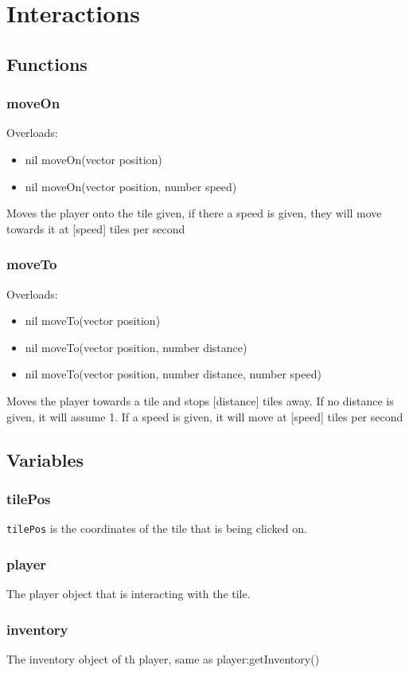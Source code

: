 \documentclass{book}
\newenvironment{ulist}
	{\begin{itemize}
			\itemsep0em}
	{\end{itemize}}
\begin{document}
\section{Interactions}
\subsection{Functions}
\subsubsection{moveOn}
Overloads:
\begin{ulist}
	\item nil moveOn(vector position)
	\item nil moveOn(vector position, number speed)	
\end{ulist}
Moves the player onto the tile given, if there a speed is given, they will move towards it at [speed] tiles per second

\subsubsection{moveTo}
Overloads:
\begin{ulist}
	\item nil moveTo(vector position)
	\item nil moveTo(vector position, number distance)
	\item nil moveTo(vector position, number distance, number speed)
\end{ulist}
Moves the player towards a tile and stops [distance] tiles away. If no distance is given, it will assume 1. If a speed is given, it will move at [speed] tiles per second

\subsection{Variables}
\subsubsection{tilePos}
\texttt{tilePos} is the coordinates of the tile that is being clicked on.

\subsubsection{player}
The player object that is interacting with the tile.

\subsubsection{inventory}
The inventory object of th player, same as player:getInventory()
\end{document}
